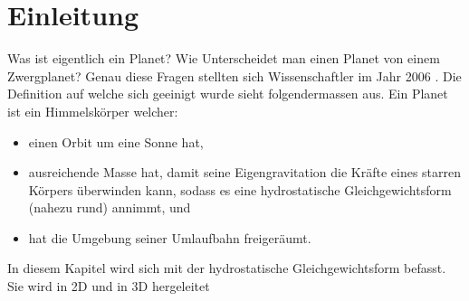 %
%
%
%
\section{Einleitung\label{planet:section:einleitung}}
Was ist eigentlich ein Planet?
Wie Unterscheidet man einen Planet von einem Zwergplanet?
Genau diese Fragen stellten sich Wissenschaftler im Jahr 2006 \cite{planet:iaub5}.
Die Definition auf welche sich geeinigt wurde sieht folgendermassen aus.
Ein Planet ist ein Himmelskörper welcher:
\begin{itemize}
	\item einen Orbit um eine Sonne hat,
	\item ausreichende Masse hat, damit seine Eigengravitation die Kräfte eines starren Körpers überwinden kann, sodass es eine hydrostatische Gleichgewichtsform (nahezu rund) annimmt, und
	\item hat die Umgebung seiner Umlaufbahn freigeräumt.
\end{itemize}

In diesem Kapitel wird sich mit der hydrostatische Gleichgewichtsform befasst.
Sie wird in 2D und in 3D hergeleitet


